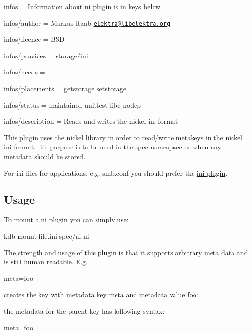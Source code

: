 
\begin{DoxyItemize}
\item infos = Information about ni plugin is in keys below
\item infos/author = Markus Raab \href{mailto:elektra@libelektra.org}{\tt elektra@libelektra.\+org}
\item infos/licence = B\+S\+D
\item infos/provides = storage/ini
\item infos/needs =
\item infos/placements = getstorage setstorage
\item infos/status = maintained unittest libc nodep
\item infos/description = Reads and writes the nickel ini format
\end{DoxyItemize}

This plugin uses the nickel library in order to read/write \hyperlink{md_doc_help_elektra-metadata_doc_help_elektra-metadata_md}{metakeys} in the nickel ini format. It's purpose is to be used in the {\ttfamily spec}-\/namespace or when any metadata should be stored.

For ini files for applications, e.\+g. smb.\+conf you should prefer the \hyperlink{md_src_plugins_ini_README_src_plugins_ini_README_md}{ini plugin}.

\subsection*{Usage}

To mount a ni plugin you can simply use\+: \begin{DoxyVerb}kdb mount file.ini spec/ni ni
\end{DoxyVerb}


The strength and usage of this plugin is that it supports arbitrary meta data and is still human readable. E.\+g. \begin{DoxyVerb}[key]
meta=foo
\end{DoxyVerb}


creates the key with metadata key {\ttfamily meta} and metadata value {\ttfamily foo}\+: 


the metadata for the parent key has following syntax\+: \begin{DoxyVerb}[]
meta=foo
\end{DoxyVerb}


